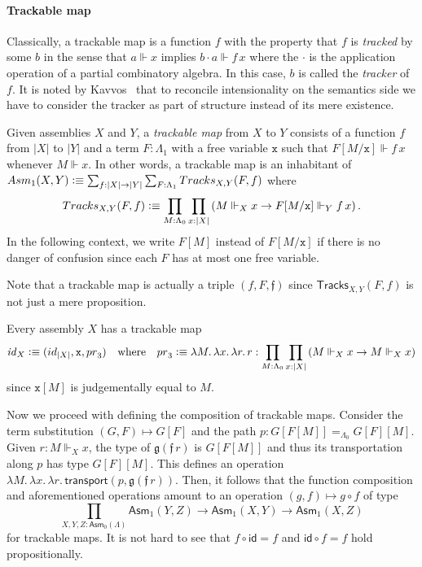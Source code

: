 \documentclass[a4paper,UKenglish,numberwithinsect,cleveref,thm-restate]{lipics-v2021}
\newcommand{\Asm}{\mathsf{Asm}}
\newcommand{\defeq}{\vcentcolon\equiv}
\newcommand{\id}{\mathsf{id}}
\newcommand{\iid}{\mathit{id}}
\newcommand{\pr}{\mathsf{pr}}
\theoremstyle{plain}
\begin{document}
\paragraph*{Trackable map}%
Classically, a trackable map is a function $f$ with the property that $f$ is \emph{tracked} by some $b$ in the sense that $a \Vdash x$ implies $b \cdot a \Vdash f\,x$ where the $\cdot$ is the application operation of a partial combinatory algebra. In this case, $b$ is called the \emph{tracker} of $f$.
It is noted by Kavvos~\cite{Kavvos2017b} that to reconcile intensionality on the semantics side we have to consider the tracker as part of structure instead of its mere existence.
\begin{definition}\label{def:trackable}
  Given assemblies $X$ and $Y$, a \emph{trackable map} from $X$ to $Y$ consists of a function $f$ from $|X|$ to $|Y|$ and a term $F : \Lambda_1$ with a free variable $\mathtt{x}$ such that $F[M/\mathtt{x}] \Vdash f\,x$ whenever $M \Vdash x$.
  In other words, a trackable map is an inhabitant of $\Asm_1(X, Y) \defeq \sum_{f : |X| \to |Y|} \sum_{F : \Lambda_1} \mathsf{Tracks}_{X, Y}(F, f)$ where
  \[
    \mathsf{Tracks}_{X, Y}(F, f) \defeq \prod_{M : \Lambda_0} \prod_{x : |X|}
    \left( M \Vdash_X x \to F[M/\mathtt{x}] \Vdash_Y f\, x \right).
  \]
  In the following context, we write $F[M]$ instead of $F[M/\mathtt{x}]$ if there is no danger of confusion since each $F$ has at most one free variable.
\end{definition}
Note that a trackable map is actually a triple $(f, F, \mathfrak{f})$ since $\mathsf{Tracks}_{X, Y}(F, f)$ is not just a mere proposition.

\begin{example}[Identity]
  Every assembly $X$ has a trackable map
  \[
    \iid_X \defeq (\id_{|X|}, \mathtt{x}, \pr_3)
    \quad\text{where}\quad
  \pr_3 \defeq \lambda M.\,\lambda x.\,\lambda r.\, r : \prod_{M : \Lambda_0} \prod_{x : |X|} \left( M \Vdash_X x \to M  \Vdash_X x  \right)
  \]
  since $\mathtt{x}[M]$ is judgementally equal to $M$.
\end{example}
Now we proceed with defining the composition of trackable maps. Consider the term substitution $(G, F)
\mapsto G [ F ]$ and the path $p : G[F[M]] =_{\Lambda_0} G[F] [M]$.
Given $r : M \Vdash_X x$, the type of $\mathfrak{g}(\mathfrak{f}\,r)$ is $G[F[M]]$ and thus its transportation along $p$ has type $G[F][M]$.
This defines an operation $\lambda M.\,\lambda x.\,\lambda r.\, \mathsf{transport}(p, \mathfrak{g}(\mathfrak{f}\,r))$.
Then, it follows that the function composition and aforementioned operations amount to an operation $(g, f) \mapsto g \circ f$ of type
\[
  \prod_{X, Y, Z : \Asm_0(\Lambda)} \Asm_1(Y, Z) \to \Asm_1(X, Y) \to \Asm_1(X, Z)
\]
for trackable maps. It is not hard to see that $f \circ \id = f$ and $\id \circ f = f$ hold propositionally.
\end{document}
